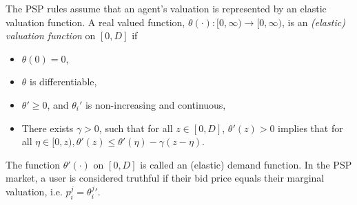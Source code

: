 The PSP rules assume that an agent's valuation is represented by an elastic valuation function.
A real valued function, $\theta(\cdot): [0,\infty) \rightarrow [0,\infty)$, is an \emph{(elastic) valuation
function} on $[0, D]$ if 
\begin{itemize}
    \item $\theta(0) = 0$,
    \item $\theta$ is differentiable,
    \item ${\theta}' \ge 0$, and ${\theta_i}'$ is non-increasing and continuous,
     \item There exists $\gamma > 0$, such that for all $z \in [0,D]$,
${\theta}'(z) > 0$ implies that for all $\eta \in [0, z), {\theta}'(z) \le
{\theta}'(\eta)
- \gamma(z - \eta)$. 
\end{itemize}
The function $\theta'(\cdot)$ on $[0, D]$ is called an (elastic) demand
function.
In the PSP market, a
user is considered truthful if their bid price equals their marginal valuation,
i.e. $p_i^j = {\theta_i^j}'$.


